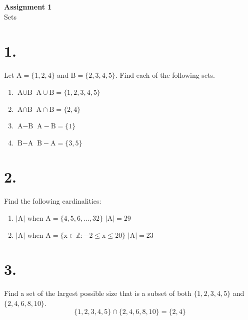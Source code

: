 \documentclass[11pt, letterpaper, includehead]{article}
\begin{document}
 

\pagestyle{fancy}
\fancyhead{}
\fancyfoot{}


\begin{center}
    \Large{\textbf{Assignment 1}}\\
    \Large{Sets}
\end{center}

\section*{1.} Let $\text{A} = \{1, 2, 4\}$ and $\text{B} = \{2, 3, 4, 5\}$. Find each of the following sets.
\begin{enumerate}[label=(\alph*)]
    \item $\text{A} \cup \text{B}$ \newline
    $\text{A} \cup \text{B} = \{1, 2, 3, 4, 5\}$

    \item $\text{A} \cap \text{B}$ \newline 
    $\text{A} \cap \text{B} = \{ 2, 4\}$

    \item $\text{A} - \text{B}$ \newline
    $\text{A} - \text{B} = \{1\}$

    \item $\text{B} - \text{A}$ \newline
    $\text{B} - \text{A} = \{3, 5\}$
\end{enumerate}

\section*{2.} Find the following cardinalities:
\begin{enumerate}[label=(\alph*)]
    \item $|\text{A}|  \text{ when A} = \{4, 5, 6, \dots, 32 \}$ \newline 
    $|\text{A}| = 29$
    \item $|\text{A}|  \text{ when A} = \{\text{x} \in \mathbb{Z}: -2 \le \text{x} \le 20\}$ \newline
    $|\text{A}| = 23$
\end{enumerate}

\section*{3.} Find a set of the largest possible size that is a subset of both $\{1, 2, 3, 4, 5\}$ and $\{2, 4, 6, 8, 10\}$.
\[\{1, 2, 3, 4, 5\} \cap \{2, 4, 6, 8, 10\} = \{2, 4\}\]
\end{document}
